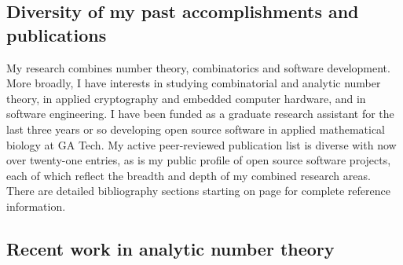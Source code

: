 \documentclass[10pt,reqno,letterpaper]{article}
\theoremstyle{plain}
\numberwithin{theorem}{section}
\theoremstyle{definition}
\begin{document}
\subsection{Diversity of my past accomplishments and publications}

My research combines number theory, combinatorics and software development. 
More broadly, I have interests in studying combinatorial and analytic number theory, 
in applied cryptography and embedded computer hardware, and in software engineering. 
I have been funded as a graduate research assistant for the last three years or so developing 
open source software in applied mathematical biology at GA Tech. 
My active peer-reviewed publication list is diverse with now over twenty-one entries, as is my 
public profile of open source software projects, each of which reflect the breadth and 
depth of my combined research areas. 
There are detailed bibliography sections starting on page 
\pageref{page_Section_BibliographyB} for complete reference information. 

\subsection{Recent work in analytic number theory}
\label{subSection_PriorWork_MertensFunctionMx} 
\end{document}
